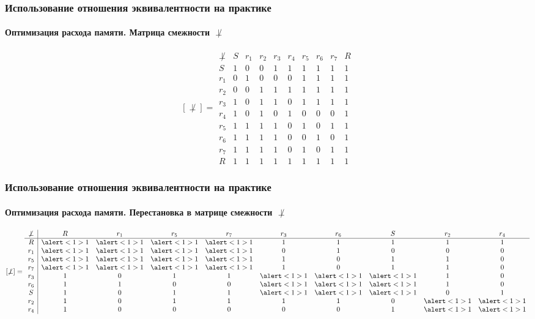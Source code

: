 \begin{frame}
    \frametitle{Использование отношения эквивалентности на практике}
    \framesubtitle{Оптимизация расхода памяти. Матрица смежности $\not\perp$}
    
    \[
        [\not\perp] = 
        \begin{array}{c|ccccccccc}
            \not\perp
                & S &r_1&r_2&r_3&r_4&r_5&r_6&r_7& R\\ \hline
            S   & 1 & 0 & 0 & 1 & 1 & 1 & 1 & 1 & 1\\
            r_1 & 0 & 1 & 0 & 0 & 0 & 1 & 1 & 1 & 1\\
            r_2 & 0 & 0 & 1 & 1 & 1 & 1 & 1 & 1 & 1\\
            r_3 & 1 & 0 & 1 & 1 & 0 & 1 & 1 & 1 & 1\\
            r_4 & 1 & 0 & 1 & 0 & 1 & 0 & 0 & 0 & 1\\
            r_5 & 1 & 1 & 1 & 1 & 0 & 1 & 0 & 1 & 1\\
            r_6 & 1 & 1 & 1 & 1 & 0 & 0 & 1 & 0 & 1\\
            r_7 & 1 & 1 & 1 & 1 & 0 & 1 & 0 & 1 & 1\\
            R   & 1 & 1 & 1 & 1 & 1 & 1 & 1 & 1 & 1
        \end{array}
    \]
\end{frame}

\begin{frame}
    \frametitle{Использование отношения эквивалентности на практике}
    \framesubtitle{Оптимизация расхода памяти. Перестановка в матрице смежности $\not\perp$}
    
    \[
        [\not\perp] = 
        \begin{array}{c|ccccccccc}
            \not\perp
                & R &r_1&r_5&r_7&r_3&r_6& S &r_2&r_4\\\hline
            R   & \alert<1>{1} & \alert<1>{1} & \alert<1>{1} & \alert<1>{1} & 1 & 1 & 1 & 1 & 1\\
            r_1 & \alert<1>{1} & \alert<1>{1} & \alert<1>{1} & \alert<1>{1} & 0 & 1 & 0 & 0 & 0\\
            r_5 & \alert<1>{1} & \alert<1>{1} & \alert<1>{1} & \alert<1>{1} & 1 & 0 & 1 & 1 & 0\\
            r_7 & \alert<1>{1} & \alert<1>{1} & \alert<1>{1} & \alert<1>{1} & 1 & 0 & 1 & 1 & 0\\
            r_3 & 1 & 0 & 1 & 1 & \alert<1>{1} & \alert<1>{1} & \alert<1>{1} & 1 & 0\\
            r_6 & 1 & 1 & 0 & 0 & \alert<1>{1} & \alert<1>{1} & \alert<1>{1} & 1 & 0\\
            S   & 1 & 0 & 1 & 1 & \alert<1>{1} & \alert<1>{1} & \alert<1>{1} & 0 & 1\\
            r_2 & 1 & 0 & 1 & 1 & 1 & 1 & 0 & \alert<1>{1} & \alert<1>{1}\\
            r_4 & 1 & 0 & 0 & 0 & 0 & 0 & 1 & \alert<1>{1} & \alert<1>{1}
        \end{array}
    \]
\end{frame}

